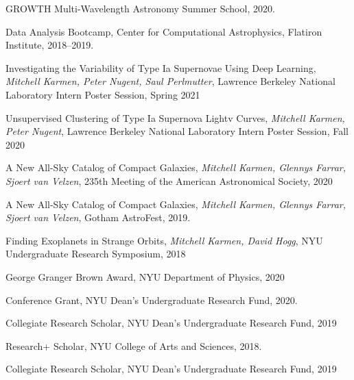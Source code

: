 \documentclass[12pt,letterpaper]{article}
\begin{document}
\begin{list}{}{\cvlist}

\item
  GROWTH Multi-Wavelength Astronomy Summer School, 2020.


\item
  Data Analysis Bootcamp, Center for Computational Astrophysics, Flatiron Institute, 2018--2019.

\end{list}

\begin{list}{}{\cvlist}

\item
  Investigating the Variability of Type Ia Supernovae Using Deep Learning, \textit{Mitchell Karmen, Peter Nugent, Saul Perlmutter}, Lawrence Berkeley National Laboratory Intern Poster Session, Spring 2021
\item
  Unsupervised Clustering of Type Ia Supernova Lightv Curves, \textit{Mitchell Karmen, Peter Nugent}, Lawrence Berkeley National Laboratory Intern Poster Session, Fall 2020

\item
  A New All-Sky Catalog of Compact Galaxies, \textit{Mitchell Karmen, Glennys Farrar, Sjoert van Velzen}, 235th Meeting of the American Astronomical Society, 2020

\item
  A New All-Sky Catalog of Compact Galaxies, \textit{Mitchell Karmen, Glennys Farrar, Sjoert van Velzen}, Gotham AstroFest, 2019.

\item
  Finding Exoplanets in Strange Orbits, \textit{Mitchell Karmen, David Hogg}, NYU Undergraduate Research Symposium, 2018

\end{list}


\begin{list}{}{\cvlist}

\item
  George Granger Brown Award, NYU Department of Physics, 2020

\item
  Conference Grant, NYU Dean's Undergraduate Research Fund, 2020.

\item
  Collegiate Research Scholar, NYU Dean's Undergraduate Research Fund, 2019

\item
  Research+ Scholar, NYU College of Arts and Sciences, 2018.

\item
  Collegiate Research Scholar, NYU Dean's Undergraduate Research Fund, 2019

\end{list}
\end{document}
